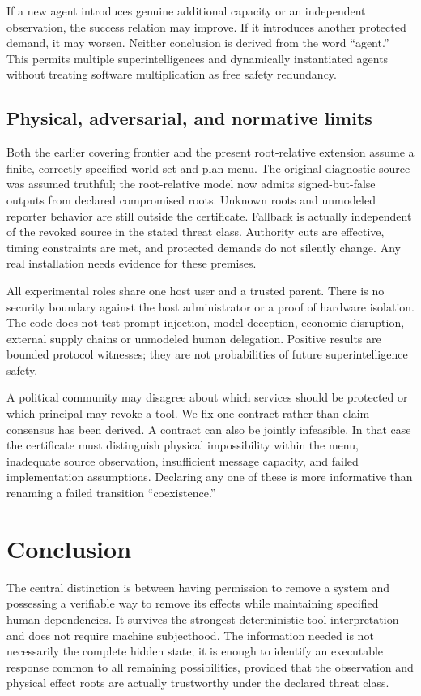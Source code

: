 \documentclass[11pt,a4paper]{article}
\theoremstyle{definition}\newtheorem{definition}{Definition}
\begin{document}
If a new agent introduces genuine additional capacity or an independent observation, the success relation may improve. If it introduces another protected demand, it may worsen. Neither conclusion is derived from the word ``agent.'' This permits multiple superintelligences and dynamically instantiated agents without treating software multiplication as free safety redundancy.

\subsection{Physical, adversarial, and normative limits}
Both the earlier covering frontier and the present root-relative extension assume a finite, correctly specified world set and plan menu. The original diagnostic source was assumed truthful; the root-relative model now admits signed-but-false outputs from declared compromised roots. Unknown roots and unmodeled reporter behavior are still outside the certificate. Fallback is actually independent of the revoked source in the stated threat class. Authority cuts are effective, timing constraints are met, and protected demands do not silently change. Any real installation needs evidence for these premises.

All experimental roles share one host user and a trusted parent. There is no security boundary against the host administrator or a proof of hardware isolation. The code does not test prompt injection, model deception, economic disruption, external supply chains or unmodeled human delegation. Positive results are bounded protocol witnesses; they are not probabilities of future superintelligence safety.

A political community may disagree about which services should be protected or which principal may revoke a tool. We fix one contract rather than claim consensus has been derived. A contract can also be jointly infeasible. In that case the certificate must distinguish physical impossibility within the menu, inadequate source observation, insufficient message capacity, and failed implementation assumptions. Declaring any one of these is more informative than renaming a failed transition ``coexistence.''

\section{Conclusion}
The central distinction is between having permission to remove a system and possessing a verifiable way to remove its effects while maintaining specified human dependencies. It survives the strongest deterministic-tool interpretation and does not require machine subjecthood. The information needed is not necessarily the complete hidden state; it is enough to identify an executable response common to all remaining possibilities, provided that the observation and physical effect roots are actually trustworthy under the declared threat class.
\end{document}
